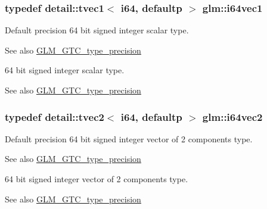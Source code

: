 \subsubsection[{\texorpdfstring{i64vec1}{i64vec1}}]{\setlength{\rightskip}{0pt plus 5cm}typedef detail\+::tvec1$<$ i64, defaultp $>$ {\bf glm\+::i64vec1}}\hypertarget{group__gtc__type__precision_ga8bc234da7e4a6436e01241f439fc7ddd}{}\label{group__gtc__type__precision_ga8bc234da7e4a6436e01241f439fc7ddd}
Default precision 64 bit signed integer scalar type. \begin{DoxySeeAlso}{See also}
\hyperlink{group__gtc__type__precision}{G\+L\+M\+\_\+\+G\+T\+C\+\_\+type\+\_\+precision}
\end{DoxySeeAlso}
64 bit signed integer scalar type. \begin{DoxySeeAlso}{See also}
\hyperlink{group__gtc__type__precision}{G\+L\+M\+\_\+\+G\+T\+C\+\_\+type\+\_\+precision} 
\end{DoxySeeAlso}
\subsubsection[{\texorpdfstring{i64vec2}{i64vec2}}]{\setlength{\rightskip}{0pt plus 5cm}typedef detail\+::tvec2$<$ i64, defaultp $>$ {\bf glm\+::i64vec2}}\hypertarget{group__gtc__type__precision_ga75461c98baf3e3913566550bd9d8d17f}{}\label{group__gtc__type__precision_ga75461c98baf3e3913566550bd9d8d17f}
Default precision 64 bit signed integer vector of 2 components type. \begin{DoxySeeAlso}{See also}
\hyperlink{group__gtc__type__precision}{G\+L\+M\+\_\+\+G\+T\+C\+\_\+type\+\_\+precision}
\end{DoxySeeAlso}
64 bit signed integer vector of 2 components type. \begin{DoxySeeAlso}{See also}
\hyperlink{group__gtc__type__precision}{G\+L\+M\+\_\+\+G\+T\+C\+\_\+type\+\_\+precision} 
\end{DoxySeeAlso}
